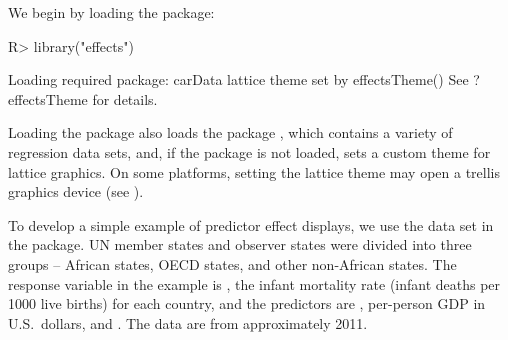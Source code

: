 \documentclass[article]{jss}
\begin{document}
We begin by loading the  package:
%
\begin{Schunk}
\begin{Sinput}
R> library("effects")
\end{Sinput}
\begin{Soutput}
Loading required package: carData
lattice theme set by effectsTheme()
See ?effectsTheme for details.
\end{Soutput}
\end{Schunk}
%
Loading the  package also loads the  package
\citep{FoxWeisbergPrice17}, which contains a variety of regression
data sets, and, if the  package \citep{Sarkar08} is not
loaded, sets a custom theme for lattice graphics. On some platforms,
setting the lattice theme may open a trellis graphics device (see
).

To develop a simple example of predictor effect displays, we use the
 data set in the  package. UN member states and
observer states were divided into three groups -- African states, OECD
states, and other non-African states.  The response variable in the
example is , the infant mortality rate (infant
deaths per 1000 live births) for each country, and the predictors are
, per-person GDP in U.S.~dollars, and . The
data are from approximately 2011.
\end{document}
